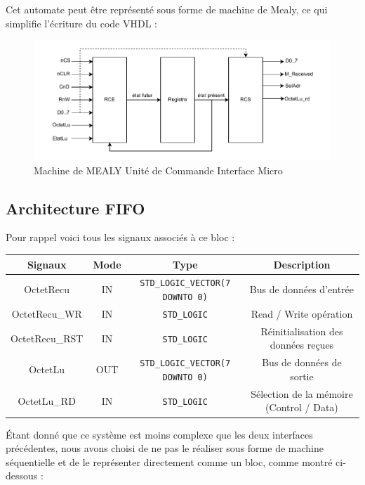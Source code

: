 Cet automate peut être représenté sous forme de machine de Mealy, ce qui simplifie l’écriture du code VHDL : 

\begin{figure}[H]
    \centering
    \includegraphics[width=0.8\linewidth]{images/inter/MEALY_Interface_Micro.pdf}
    \caption{Machine de MEALY Unité de Commande Interface Micro}
    \label{fig:placeholder}
\end{figure}

\subsection{Architecture FIFO}

Pour rappel voici tous les signaux associés à ce bloc : 
\newline

\begin{center}
    \begin{tabular}{| c || c | c | c |}
     \hline			
       \textbf{Signaux} & \textbf{Mode} & \textbf{Type} & \textbf{Description}  \\ \hline 
       OctetRecu & IN & \texttt{STD\_LOGIC\_VECTOR(7 DOWNTO 0)} & Bus de données d’entrée \\
       OctetRecu\_WR & IN & \texttt{STD\_LOGIC} & Read / Write opération \\
       OctetRecu\_RST & IN & \texttt{STD\_LOGIC} & Réinitialisation des données reçues \\
       OctetLu & OUT & \texttt{STD\_LOGIC\_VECTOR(7 DOWNTO 0)} & Bus de données de sortie \\
       OctetLu\_RD & IN & \texttt{STD\_LOGIC} & Sélection de la mémoire (Control / Data) \\
     \hline  
    \end{tabular}
\end{center}

Étant donné que ce système est moins complexe que les deux interfaces précédentes, nous avons choisi de ne pas le réaliser sous forme de machine séquentielle et de le représenter directement comme un bloc, comme montré ci-dessous : 
\newline

